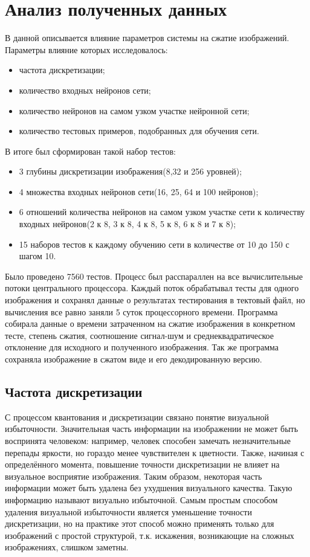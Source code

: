 \section{Анализ полученных данных}
\label{sec:analysis}

В данной описывается влияние параметров системы на сжатие изображений.
Параметры влияние которых исследовалось:

\begin{itemize}
  \item частота дискретизации;
  \item количество входных нейронов сети;
  \item количество нейронов на самом узком участке нейронной сети;
  \item количество тестовых примеров, подобранных для обучения сети.
\end{itemize}

В итоге был сформирован такой набор тестов:

\begin{itemize}
  \item 3 глубины дискретизации изображения(8,32 и 256 уровней);
  \item 4 множества входных нейронов сети(16, 25, 64 и 100 нейронов);
  \item 6 отношений количества нейронов на самом узком участке сети к количеству входных нейронов(2 к 8, 3 к 8, 4 к 8, 5 к 8, 6 к 8 и 7 к 8);
  \item 15 наборов тестов к каждому обучению сети в количестве от 10 до 150 с шагом 10.
\end{itemize}

Было проведено 7560 тестов. Процесс был расспараллен на все вычислительные потоки центрального процессора.
Каждый поток обрабатывал тесты для одного изображения и сохранял данные о результатах тестирования в тектовый файл,
но вычисления все равно заняли 5 суток процессорного времени.
Программа собирала данные о времени затраченном на сжатие изображения в конкретном тесте, степень сжатия,
соотношение сигнал-шум и среднеквадратическое отклонение для исходного и полученного изображения.
Так же программа сохраняла изображение в сжатом виде и его декодированную версию.

\subsection{Частота дискретизации}
\label{sub:analysis:discrete}
С процессом квантования и дискретизации связано понятие визуальной избыточности.
Значительная часть информации на изображении не может быть воспринята человеком:
например, человек способен замечать незначительные перепады яркости,
но гораздо менее чувствителен к цветности. Также, начиная с определённого момента,
повышение точности дискретизации не влияет на визуальное восприятие изображения.
Таким образом, некоторая часть информации может быть удалена без ухудшения визуального качества.
Такую информацию называют визуально избыточной. Самым простым способом удаления визуальной
избыточности является уменьшение точности дискретизации, но на практике этот способ можно
применять только для изображений с простой структурой, т.к. искажения, возникающие на сложных изображениях, слишком заметны.

